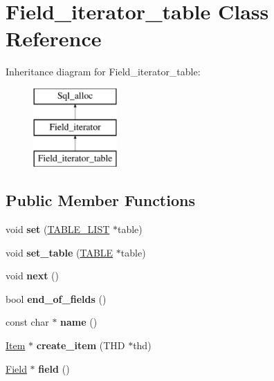 \hypertarget{classField__iterator__table}{}\section{Field\+\_\+iterator\+\_\+table Class Reference}
\label{classField__iterator__table}
Inheritance diagram for Field\+\_\+iterator\+\_\+table\+:\begin{figure}[H]
\begin{center}
\leavevmode
\includegraphics[height=3.000000cm]{classField__iterator__table}
\end{center}
\end{figure}
\subsection*{Public Member Functions}
\begin{DoxyCompactItemize}
\item 
\mbox{\label{classField__iterator__table_ad92239ac888b0b59b6dbd90ec8123ce7}} 
void {\bfseries set} (\mbox{\hyperlink{structTABLE__LIST}{T\+A\+B\+L\+E\+\_\+\+L\+I\+ST}} $\ast$table)
\item 
\mbox{\label{classField__iterator__table_ab0a1f812d54a7391cfe37ebfebf3577e}} 
void {\bfseries set\+\_\+table} (\mbox{\hyperlink{structTABLE}{T\+A\+B\+LE}} $\ast$table)
\item 
\mbox{\label{classField__iterator__table_a051ec443c828a871c1d43bc9c17c4644}} 
void {\bfseries next} ()
\item 
\mbox{\label{classField__iterator__table_a927662c80e35ccb836b14caaa34d6269}} 
bool {\bfseries end\+\_\+of\+\_\+fields} ()
\item 
\mbox{\label{classField__iterator__table_a7cfce1b7c33378a194881949b9601327}} 
const char $\ast$ {\bfseries name} ()
\item 
\mbox{\label{classField__iterator__table_a0f372fedc0994fcdf9030da7e0c73000}} 
\mbox{\hyperlink{classItem}{Item}} $\ast$ {\bfseries create\+\_\+item} (T\+HD $\ast$thd)
\item 
\mbox{\label{classField__iterator__table_a724698818dbb210d4f4b8de9b51851ae}} 
\mbox{\hyperlink{classField}{Field}} $\ast$ {\bfseries field} ()
\end{DoxyCompactItemize}
